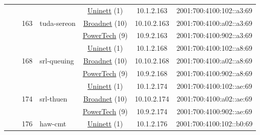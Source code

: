 \begin{small}
\begin{center}
\begin{longtable}{|c|c|c|c|c|c|c|c|}
  &  & \multirow{3}{*}{\tiny{163}} & \multicolumn{1}{|l|}{\multirow{3}{*}{\tiny{tuda-sereon}}} & \multicolumn{2}{|c|}{\tiny{\href{https://www.uninett.no}{Uninett} (1)}} & \tiny{10.1.2.163} & \tiny{2001:700:4100:102::a3:69} \\* \cline{5-5}\cline{6-6}\cline{7-7}\cline{8-8}
  &  &  &  & \multicolumn{2}{|c|}{\tiny{\href{https://www.broadnet.no}{Broadnet} (10)}} & \tiny{10.10.2.163} & \tiny{2001:700:4100:a02::a3:69} \\* \cline{5-5}\cline{6-6}\cline{7-7}\cline{8-8}
  &  &  &  & \multicolumn{2}{|c|}{\tiny{\href{http://www.powertech.no}{PowerTech} (9)}} & \tiny{10.9.2.163} & \tiny{2001:700:4100:902::a3:69} \\* \cline{3-3}\cline{4-4}\cline{5-5}\cline{6-6}\cline{7-7}\cline{8-8}
  &  & \multirow{3}{*}{\tiny{168}} & \multicolumn{1}{|l|}{\multirow{3}{*}{\tiny{srl-queuing}}} & \multicolumn{2}{|c|}{\tiny{\href{https://www.uninett.no}{Uninett} (1)}} & \tiny{10.1.2.168} & \tiny{2001:700:4100:102::a8:69} \\* \cline{5-5}\cline{6-6}\cline{7-7}\cline{8-8}
  &  &  &  & \multicolumn{2}{|c|}{\tiny{\href{https://www.broadnet.no}{Broadnet} (10)}} & \tiny{10.10.2.168} & \tiny{2001:700:4100:a02::a8:69} \\* \cline{5-5}\cline{6-6}\cline{7-7}\cline{8-8}
  &  &  &  & \multicolumn{2}{|c|}{\tiny{\href{http://www.powertech.no}{PowerTech} (9)}} & \tiny{10.9.2.168} & \tiny{2001:700:4100:902::a8:69} \\* \cline{3-3}\cline{4-4}\cline{5-5}\cline{6-6}\cline{7-7}\cline{8-8}
  &  & \multirow{3}{*}{\tiny{174}} & \multicolumn{1}{|l|}{\multirow{3}{*}{\tiny{srl-thuen}}} & \multicolumn{2}{|c|}{\tiny{\href{https://www.uninett.no}{Uninett} (1)}} & \tiny{10.1.2.174} & \tiny{2001:700:4100:102::ae:69} \\* \cline{5-5}\cline{6-6}\cline{7-7}\cline{8-8}
  &  &  &  & \multicolumn{2}{|c|}{\tiny{\href{https://www.broadnet.no}{Broadnet} (10)}} & \tiny{10.10.2.174} & \tiny{2001:700:4100:a02::ae:69} \\* \cline{5-5}\cline{6-6}\cline{7-7}\cline{8-8}
  &  &  &  & \multicolumn{2}{|c|}{\tiny{\href{http://www.powertech.no}{PowerTech} (9)}} & \tiny{10.9.2.174} & \tiny{2001:700:4100:902::ae:69} \\* \cline{3-3}\cline{4-4}\cline{5-5}\cline{6-6}\cline{7-7}\cline{8-8}
  &  & \multirow{3}{*}{\tiny{176}} & \multicolumn{1}{|l|}{\multirow{3}{*}{\tiny{haw-cmt}}} & \multicolumn{2}{|c|}{\tiny{\href{https://www.uninett.no}{Uninett} (1)}} & \tiny{10.1.2.176} & \tiny{2001:700:4100:102::b0:69} \\* \cline{5-5}\cline{6-6}\cline{7-7}\cline{8-8}

\end{longtable}
\end{center}
\end{small}
